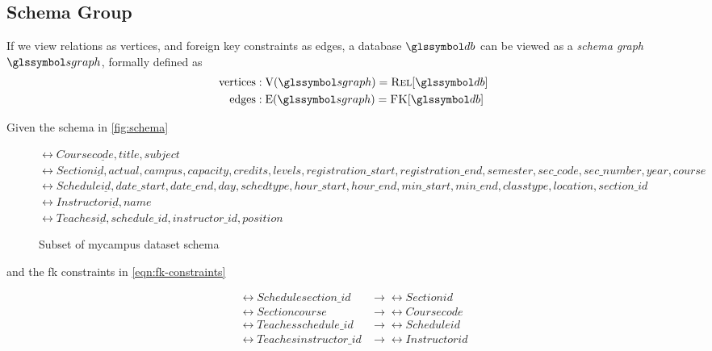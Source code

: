 	\subsection{Schema Group}
		\begin{defn}
		\label{def:schema-graph}
			If we view relations as vertices, and foreign key constraints as edges, a database \(\db\) can be viewed as a \emph{schema graph} \(\sgraph{}\), formally defined as
			\begin{align}
				\text{vertices} &: \text{V}(\sgraph) = \relations{\db} \\
				\text{edges} &: \text{E}(\sgraph) = \fks{\db}
			\end{align}
		\end{defn}
		
		\begin{ex}
			Given the schema in \vref{fig:schema}
			
			\begin{figure}
				\centering
				
				\(\rel{Course}{\underline{code}, title, subject}\) \\
				\(\rel{Section}{\underline{id}, actual, campus, capacity, credits, levels, registration\_start, registration\_end, semester, sec\_code, sec\_number, year, course}\) \\
				\(\rel{Schedule}{\underline{id}, date\_start, date\_end, day, schedtype, hour\_start, hour\_end, min\_start, min\_end, classtype, location, section\_id}\) \\
				\(\rel{Instructor}{\underline{id}, name}\) \\
				\(\rel{Teaches}{\underline{id}, schedule\_id, instructor\_id, position}\) \\
				
				\caption{Subset of mycampus dataset schema}
				\label{fig:schema}
			\end{figure}
			
			
			and the \gls{fk} constraints in \vref{eqn:fk-constraints}
			
			\begin{figure}
				\begin{align*}
					\rel{Schedule}{section\_id} &\rightarrow \rel{Section}{id} \\
					\rel{Section}{course} &\rightarrow \rel{Course}{code} \\
					\rel{Teaches}{schedule\_id} &\rightarrow \rel{Schedule}{id} \\
					\rel{Teaches}{instructor\_id} &\rightarrow \rel{Instructor}{id} \\
				\end{align*}
				

\end{figure}
\end{ex}
